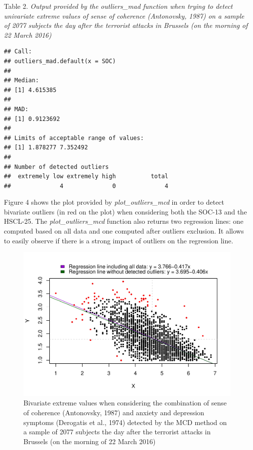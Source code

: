 \documentclass[man,floatsintext]{apa6}
\begin{document}
Table 2.
\emph{Output provided by the outliers\_mad function when trying to detect univariate extreme values of sense of coherence (Antonovsky, 1987) on a sample of 2077 subjects the day after the terrorist attacks in Brussels (on the morning of 22 March 2016)}

\begin{verbatim}
## Call:
## outliers_mad.default(x = SOC)
## 
## Median:
## [1] 4.615385
## 
## MAD:
## [1] 0.9123692
## 
## Limits of acceptable range of values:
## [1] 1.878277 7.352492
## 
## Number of detected outliers
##  extremely low extremely high          total 
##              4              0              4
\end{verbatim}

Figure 4 shows the plot provided by \emph{plot\_outliers\_mcd} in order to detect bivariate outliers (in red on the plot) when considering both the SOC-13 and the HSCL-25. The \emph{plot\_outliers\_mcd} function also returns two regression lines: one computed based on all data and one computed after outliers exclusion. It allows to easily observe if there is a strong impact of outliers on the regression line.

\begin{figure}
\centering
\includegraphics{Outliers_files/figure-latex/MCDSOC-1.pdf}
\caption{\label{fig:MCDSOC}Bivariate extreme values when considering the combination of sense of coherence (Antonovsky, 1987) and anxiety and depression symptoms (Derogatis et al., 1974) detected by the MCD method on a sample of 2077 subjects the day after the terrorist attacks in Brussels (on the morning of 22 March 2016)}
\end{figure}
\end{document}

